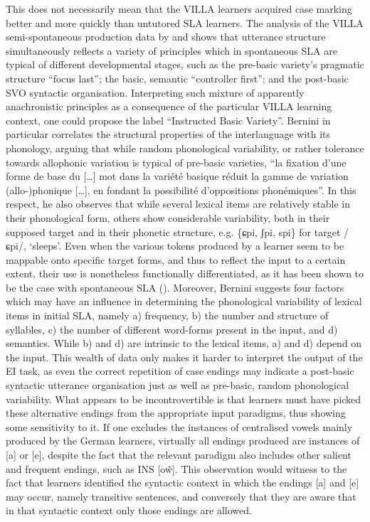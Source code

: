 This does not necessarily mean that the VILLA learners acquired case marking better and more quickly than untutored SLA learners. The analysis of the VILLA semi-spontaneous production data by \citet{Bernini2016} and \citet{Dimroth2018} shows that utterance structure simultaneously reflects a variety of principles which in spontaneous SLA are typical of different developmental stages, such as the pre-basic variety’s pragmatic structure ``focus last''; the basic, semantic ``controller first''; and the post-basic SVO syntactic organisation. Interpreting such mixture of apparently anachronistic principles as a consequence of the particular VILLA learning context, one could propose the label ``Instructed Basic Variety''. Bernini in particular correlates the structural properties of the interlanguage with its phonology, arguing that while random phonological variability, or rather tolerance towards allophonic variation is typical of pre-basic varieties, ``la fixation d’une forme de base du […] mot dans la variété basique réduit la gamme de variation (allo-)phonique […], en fondant la possibilité d’oppositions phonémiques''. In this respect, he also observes that while several lexical items are relatively stable in their phonological form, others show considerable variability, both in their supposed target and in their phonetic structure, e.g. \{ɕpi, ʃpi, spi\} for target /ɕpi/, ‘sleeps’. Even when the various tokens produced by a learner seem to be mappable onto specific target forms, and thus to reflect the input to a certain extent, their use is nonetheless functionally differentiated, as it has been shown to be the case with spontaneous SLA (\citealt{BroederEtAl1993}). Moreover, Bernini suggests four factors which may have an influence in determining the phonological variability of lexical items in initial SLA, namely a) frequency, b) the number and structure of syllables, c) the number of different word-forms present in the input, and d) semantics. While b) and d) are intrinsic to the lexical items, a) and d) depend on the input. This wealth of data only makes it harder to interpret the output of the EI task, as even the correct repetition of case endings may indicate a post-basic syntactic utterance organisation just as well as pre-basic, random phonological variability. What appears to be incontrovertible is that learners must have picked these alternative endings from the appropriate input paradigms, thus showing some sensitivity to it. If one excludes the instances of centralised vowels mainly produced by the German learners, virtually all endings produced are instances of [a] or [e], despite the fact that the relevant paradigm also includes other salient and frequent endings, such as INS [o\~{w}]. This observation would witness to the fact that learners identified the syntactic context in which the endings [a] and [e] may occur, namely transitive sentences, and conversely that they are aware that in that syntactic context only those endings are allowed.

